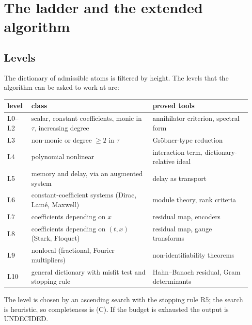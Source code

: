 \documentclass[11pt]{article}
\theoremstyle{plain}
\theoremstyle{definition}
\theoremstyle{remark}
\newcommand{\lab}[1]{\textsf{#1}}           %
\newcommand{\UND}{\lab{UNDECIDED}}
\begin{document}
\section{The ladder and the extended algorithm}\label{sec:ladder}
\subsection{Levels}
The dictionary of admissible atoms is filtered by height. The levels that the algorithm can be asked to work at are:
\begin{center}\small
\begin{tabular}{@{}llp{6.3cm}@{}}
\toprule
level & class & proved tools\\
\midrule
L0--L2 & scalar, constant coefficients, monic in $\tau$, increasing degree & annihilator criterion, spectral form\\
L3 & non-monic or degree $\ge2$ in $\tau$ & Gr\"obner-type reduction\\
L4 & polynomial nonlinear & interaction term, dictionary-relative ideal\\
L5 & memory and delay, via an augmented system & delay as transport\\
L6 & constant-coefficient systems (Dirac, Lam\'e, Maxwell) & module theory, rank criteria\\
L7 & coefficients depending on $x$ & residual map, encoders\\
L8 & coefficients depending on $(t,x)$ (Stark, Floquet) & residual map, gauge transforms\\
L9 & nonlocal (fractional, Fourier multipliers) & non-identifiability theorems\\
L10 & general dictionary with misfit test and stopping rule & Hahn--Banach residual, Gram determinants\\
\bottomrule
\end{tabular}
\end{center}
The level is chosen by an ascending search with the stopping rule R5; the search is heuristic, so completeness is (C). If the budget is exhausted the output is \UND.
\end{document}
